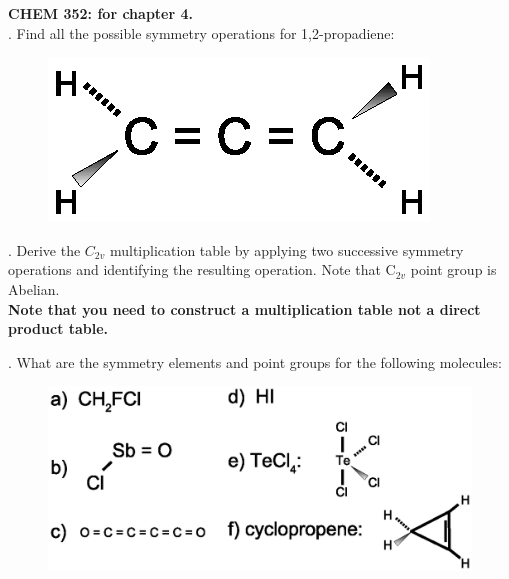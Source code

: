\noindent
\textbf{CHEM 352:
 for chapter 4.}\\

. Find all the possible symmetry operations for 1,2-propadiene:\\

\vspace{-0.5cm}
\begin{figure}[h]
\centering
\includegraphics[scale=0.8]{allene}
\end{figure}
\vspace{-0.5cm}


. Derive the $C_{2v}$ multiplication table by applying two successive symmetry operations
and identifying the resulting operation. Note that C$_{2v}$ point group is Abelian.\\

\noindent
\textbf{Note that you need to construct a multiplication table not a direct product table.}\\


. What are the symmetry elements and point groups for the following molecules:\\

\vspace{-1cm}

\begin{figure}[h]
\centering
\includegraphics[scale=0.8]{molecules}
\end{figure}

